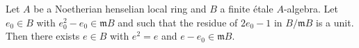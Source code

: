 \begin{lemma}

\label{lem:henselianPair-l3a-limit-identification}
Let $A$ be a Noetherian henselian local ring and $B$ a finite étale
$A$-algebra. Let $e_0 \in B$ with $e_0^2 - e_0 \in \mathfrak m B$
and such that the residue of $2 e_0 - 1$ in $B/\mathfrak m B$ is a
unit. Then there exists $e \in B$ with $e^2 = e$ and $e - e_0 \in
\mathfrak m B$.
\end{lemma}


